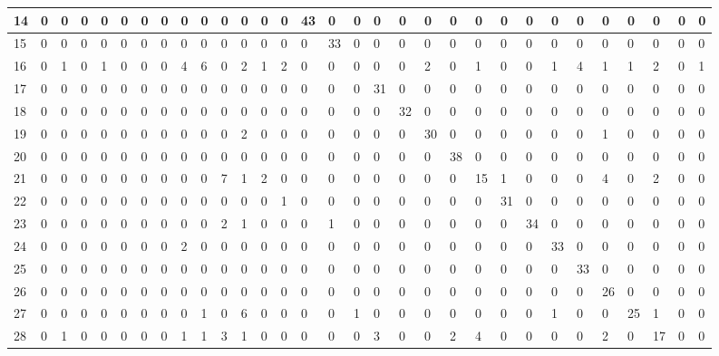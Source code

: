 \documentclass[french,12pt,a4paper,oneside,notitlepage]{report}
\begin{document}
\begin{table}[!ht]
\begin{center}
{\begin{tabular}{|l|l|l|l|l|l|l|l|l|l|l|l|l|l|l|l|l|l|l|l|l|l|l|l|l|l|l|l|l|l|l|}
\hline
14 & 0 & 0 & 0 & 0 & 0 & 0 & 0 & 0 & 0 & 0 & 0 & 0 & 0 & 43 & 0 & 0 & 0 & 0 & 0 & 0 & 0 & 0 & 0 & 0 & 0 & 0 & 0 & 0 & 0 & 0 \\
\hline
15 & 0 & 0 & 0 & 0 & 0 & 0 & 0 & 0 & 0 & 0 & 0 & 0 & 0 & 0 & 33 & 0 & 0 & 0 & 0 & 0 & 0 & 0 & 0 & 0 & 0 & 0 & 0 & 0 & 0 & 0 \\
\hline
16 & 0 & 1 & 0 & 1 & 0 & 0 & 0 & 4 & 6 & 0 & 2 & 1 & 2 & 0 & 0 & 0 & 0 & 0 & 2 & 0 & 1 & 0 & 0 & 1 & 4 & 1 & 1 & 2 & 0 & 1 \\
\hline
17 & 0 & 0 & 0 & 0 & 0 & 0 & 0 & 0 & 0 & 0 & 0 & 0 & 0 & 0 & 0 & 0 & 31 & 0 & 0 & 0 & 0 & 0 & 0 & 0 & 0 & 0 & 0 & 0 & 0 & 0 \\
\hline
18 & 0 & 0 & 0 & 0 & 0 & 0 & 0 & 0 & 0 & 0 & 0 & 0 & 0 & 0 & 0 & 0 & 0 & 32 & 0 & 0 & 0 & 0 & 0 & 0 & 0 & 0 & 0 & 0 & 0 & 0 \\
\hline
19 & 0 & 0 & 0 & 0 & 0 & 0 & 0 & 0 & 0 & 0 & 2 & 0 & 0 & 0 & 0 & 0 & 0 & 0 & 30 & 0 & 0 & 0 & 0 & 0 & 0 & 1 & 0 & 0 & 0 & 0 \\
\hline
20 & 0 & 0 & 0 & 0 & 0 & 0 & 0 & 0 & 0 & 0 & 0 & 0 & 0 & 0 & 0 & 0 & 0 & 0 & 0 & 38 & 0 & 0 & 0 & 0 & 0 & 0 & 0 & 0 & 0 & 0 \\
\hline
21 & 0 & 0 & 0 & 0 & 0 & 0 & 0 & 0 & 0 & 7 & 1 & 2 & 0 & 0 & 0 & 0 & 0 & 0 & 0 & 0 & 15 & 1 & 0 & 0 & 0 & 4 & 0 & 2 & 0 & 0 \\
\hline
22 & 0 & 0 & 0 & 0 & 0 & 0 & 0 & 0 & 0 & 0 & 0 & 0 & 1 & 0 & 0 & 0 & 0 & 0 & 0 & 0 & 0 & 31 & 0 & 0 & 0 & 0 & 0 & 0 & 0 & 0 \\
\hline
23 & 0 & 0 & 0 & 0 & 0 & 0 & 0 & 0 & 0 & 2 & 1 & 0 & 0 & 0 & 1 & 0 & 0 & 0 & 0 & 0 & 0 & 0 & 34 & 0 & 0 & 0 & 0 & 0 & 0 & 0 \\
\hline
24 & 0 & 0 & 0 & 0 & 0 & 0 & 0 & 2 & 0 & 0 & 0 & 0 & 0 & 0 & 0 & 0 & 0 & 0 & 0 & 0 & 0 & 0 & 0 & 33 & 0 & 0 & 0 & 0 & 0 & 0 \\
\hline
25 & 0 & 0 & 0 & 0 & 0 & 0 & 0 & 0 & 0 & 0 & 0 & 0 & 0 & 0 & 0 & 0 & 0 & 0 & 0 & 0 & 0 & 0 & 0 & 0 & 33 & 0 & 0 & 0 & 0 & 0 \\
\hline
26 & 0 & 0 & 0 & 0 & 0 & 0 & 0 & 0 & 0 & 0 & 0 & 0 & 0 & 0 & 0 & 0 & 0 & 0 & 0 & 0 & 0 & 0 & 0 & 0 & 0 & 26 & 0 & 0 & 0 & 0 \\
\hline
27 & 0 & 0 & 0 & 0 & 0 & 0 & 0 & 0 & 1 & 0 & 6 & 0 & 0 & 0 & 0 & 1 & 0 & 0 & 0 & 0 & 0 & 0 & 0 & 1 & 0 & 0 & 25 & 1 & 0 & 0 \\
\hline
28 & 0 & 1 & 0 & 0 & 0 & 0 & 0 & 1 & 1 & 3 & 1 & 0 & 0 & 0 & 0 & 0 & 3 & 0 & 0 & 2 & 4 & 0 & 0 & 0 & 0 & 2 & 0 & 17 & 0 & 0 \\

\end{tabular}}
\end{center}
\end{table}
\end{document}
